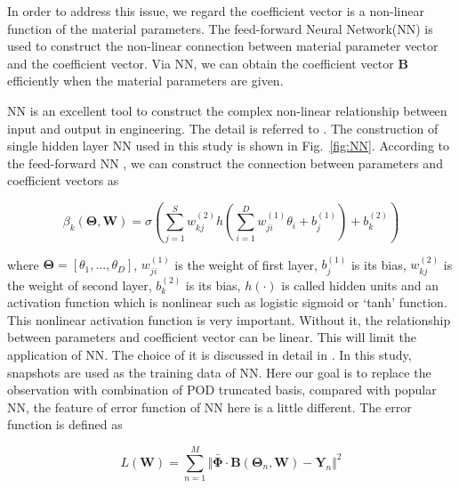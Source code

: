 \documentclass[review]{elsarticle}
\begin{document}
In order to address this issue, we regard the coefficient vector is a non-linear function of the material parameters. The feed-forward Neural Network(NN) is used to construct the non-linear connection between material parameter vector and the coefficient vector. Via NN, we can obtain the coefficient vector $\mathbf{B}$ efficiently when the material parameters are given.

NN is an excellent tool \cite{li2016identification} to construct the complex non-linear relationship between input and output in engineering. The detail is referred to \cite{bishop2006pattern}. The construction of single hidden layer NN used in this study is shown in Fig.~\ref{fig:NN}. According to the feed-forward NN \cite{bishop2006pattern}, we can construct the connection between parameters and coefficient vectors as

\begin{equation}
\label{eq:NN}
\beta_k(\mathbf{\Theta},\mathbf{W})= \sigma \left( \sum_{j=1}^S w_{kj}^{(2)} h \left( \sum_{i=1}^D w_{ji}^{(1)} \theta_i + b_{j}^{(1)} \right) + b_{k}^{(2)} \right)
\end{equation}

\noindent where $\mathbf{\Theta} = [\theta_1,...,\theta_D]$, $w_{ji}^{(1)}$ is the weight of first layer, $b_{j}^{(1)}$ is its bias, $w_{kj}^{(2)}$ is the weight of second layer, $b_{k}^{(2)}$ is its bias, $h(\cdot)$ is called hidden units and an activation function which is nonlinear such as logistic sigmoid or `tanh' function. This nonlinear activation function is very important. Without it, the relationship between parameters and coefficient vector can be linear. This will limit the application of NN. The choice of it is discussed in detail in \cite{bishop2006pattern}. In this study, snapshots are used as the training data of NN. Here our goal is to replace the observation with combination of POD truncated basis, compared with popular NN, the feature of error function of NN here is a little different. The error function is defined as

\begin{equation}
  L(\mathbf{W}) = \sum_{n=1}^M \Vert \bar{\mathbf{\Phi}} \cdot \mathbf{B} (\mathbf{\Theta}_n,\mathbf{W})-\mathbf{Y}_n \Vert ^2
\end{equation}
\end{document}
